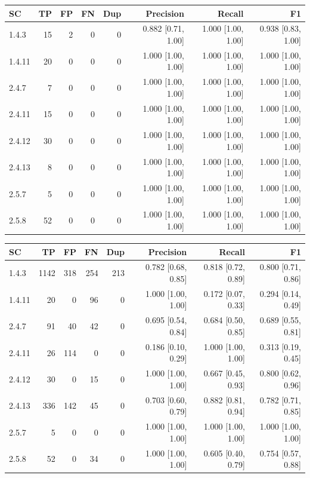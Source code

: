\begin{tabular}{lrrrrrrr}
\hline
SC & TP & FP & FN & Dup & Precision & Recall & F1 \\
\hline
1.4.3 & 15 & 2 & 0 & 0 & 0.882 [0.71, 1.00] & 1.000 [1.00, 1.00] & 0.938 [0.83, 1.00] \\
1.4.11 & 20 & 0 & 0 & 0 & 1.000 [1.00, 1.00] & 1.000 [1.00, 1.00] & 1.000 [1.00, 1.00] \\
2.4.7 & 7 & 0 & 0 & 0 & 1.000 [1.00, 1.00] & 1.000 [1.00, 1.00] & 1.000 [1.00, 1.00] \\
2.4.11 & 15 & 0 & 0 & 0 & 1.000 [1.00, 1.00] & 1.000 [1.00, 1.00] & 1.000 [1.00, 1.00] \\
2.4.12 & 30 & 0 & 0 & 0 & 1.000 [1.00, 1.00] & 1.000 [1.00, 1.00] & 1.000 [1.00, 1.00] \\
2.4.13 & 8 & 0 & 0 & 0 & 1.000 [1.00, 1.00] & 1.000 [1.00, 1.00] & 1.000 [1.00, 1.00] \\
2.5.7 & 5 & 0 & 0 & 0 & 1.000 [1.00, 1.00] & 1.000 [1.00, 1.00] & 1.000 [1.00, 1.00] \\
2.5.8 & 52 & 0 & 0 & 0 & 1.000 [1.00, 1.00] & 1.000 [1.00, 1.00] & 1.000 [1.00, 1.00] \\
\hline
\end{tabular}

\begin{tabular}{lrrrrrrr}
\hline
SC & TP & FP & FN & Dup & Precision & Recall & F1 \\
\hline
1.4.3 & 1142 & 318 & 254 & 213 & 0.782 [0.68, 0.85] & 0.818 [0.72, 0.89] & 0.800 [0.71, 0.86] \\
1.4.11 & 20 & 0 & 96 & 0 & 1.000 [1.00, 1.00] & 0.172 [0.07, 0.33] & 0.294 [0.14, 0.49] \\
2.4.7 & 91 & 40 & 42 & 0 & 0.695 [0.54, 0.84] & 0.684 [0.50, 0.85] & 0.689 [0.55, 0.81] \\
2.4.11 & 26 & 114 & 0 & 0 & 0.186 [0.10, 0.29] & 1.000 [1.00, 1.00] & 0.313 [0.19, 0.45] \\
2.4.12 & 30 & 0 & 15 & 0 & 1.000 [1.00, 1.00] & 0.667 [0.45, 0.93] & 0.800 [0.62, 0.96] \\
2.4.13 & 336 & 142 & 45 & 0 & 0.703 [0.60, 0.79] & 0.882 [0.81, 0.94] & 0.782 [0.71, 0.85] \\
2.5.7 & 5 & 0 & 0 & 0 & 1.000 [1.00, 1.00] & 1.000 [1.00, 1.00] & 1.000 [1.00, 1.00] \\
2.5.8 & 52 & 0 & 34 & 0 & 1.000 [1.00, 1.00] & 0.605 [0.40, 0.79] & 0.754 [0.57, 0.88] \\
\hline
\end{tabular}

